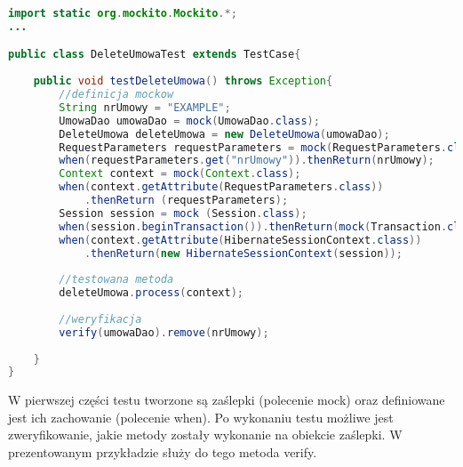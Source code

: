 \begin{lstlisting}[language=Java,style=outcode,showstringspaces=false,caption=Test akcji usuwającej umowę wykorzystujący zaślepki,label={mockito}]
import static org.mockito.Mockito.*;
...

public class DeleteUmowaTest extends TestCase{
	
	public void testDeleteUmowa() throws Exception{
		//definicja mockow
		String nrUmowy = "EXAMPLE";
		UmowaDao umowaDao = mock(UmowaDao.class);
		DeleteUmowa deleteUmowa = new DeleteUmowa(umowaDao);
		RequestParameters requestParameters = mock(RequestParameters.class);
		when(requestParameters.get("nrUmowy")).thenReturn(nrUmowy);
		Context context = mock(Context.class);
		when(context.getAttribute(RequestParameters.class))
			.thenReturn (requestParameters);
		Session session = mock (Session.class);
		when(session.beginTransaction()).thenReturn(mock(Transaction.class));
		when(context.getAttribute(HibernateSessionContext.class))
			.thenReturn(new HibernateSessionContext(session));
		
		//testowana metoda
		deleteUmowa.process(context);
		
		//weryfikacja
		verify(umowaDao).remove(nrUmowy);
		
	}
}
\end{lstlisting}

W pierwszej części testu tworzone są zaślepki (polecenie mock) oraz definiowane jest ich zachowanie (polecenie when). Po wykonaniu testu możliwe jest zweryfikowanie, jakie metody zostały wykonanie na obiekcie zaślepki. W prezentowanym przykładzie służy do tego metoda verify.

